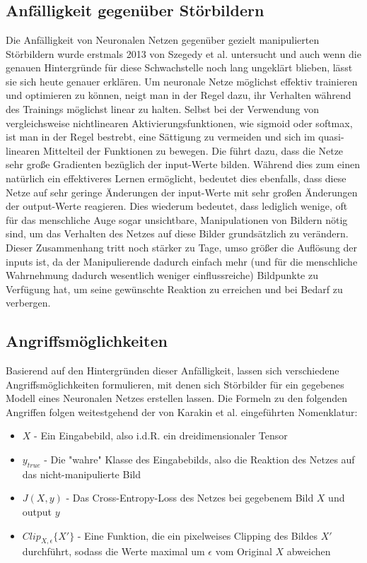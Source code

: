 \chapter{}
\label{cha:stateOfTheArt}
\section{Anfälligkeit gegenüber Störbildern}
Die Anfälligkeit von Neuronalen Netzen gegenüber gezielt manipulierten Störbildern wurde erstmals 2013 von Szegedy et al. untersucht und auch wenn die genauen Hintergründe für diese Schwachstelle noch lang ungeklärt blieben, lässt sie sich heute genauer erklären.
Um neuronale Netze möglichst effektiv trainieren und optimieren zu können, neigt man in der Regel dazu, ihr Verhalten während des Trainings möglichst linear zu halten. Selbst bei der Verwendung von vergleichsweise nichtlinearen Aktivierungsfunktionen, wie sigmoid oder softmax, ist man in der Regel bestrebt, eine Sättigung zu vermeiden und sich im quasi-linearen Mittelteil der Funktionen zu bewegen. Die führt dazu, dass die Netze sehr große Gradienten bezüglich der input-Werte bilden. Während dies zum einen natürlich ein effektiveres Lernen ermöglicht, bedeutet dies ebenfalls, dass diese Netze auf sehr geringe Änderungen der input-Werte mit sehr großen Änderungen der output-Werte reagieren. Dies wiederum bedeutet, dass lediglich wenige, oft für das menschliche Auge sogar unsichtbare, Manipulationen von Bildern nötig sind, um das Verhalten des Netzes auf diese Bilder grundsätzlich zu verändern.
Dieser Zusammenhang tritt noch stärker zu Tage, umso größer die Auflösung der inputs ist, da der Manipulierende dadurch einfach mehr (und für die menschliche Wahrnehmung dadurch wesentlich weniger einflussreiche) Bildpunkte zu Verfügung hat, um seine gewünschte Reaktion zu erreichen und bei Bedarf zu verbergen.

\section{Angriffsmöglichkeiten}
Basierend auf den Hintergründen dieser Anfälligkeit, lassen sich verschiedene Angriffsmöglichkeiten formulieren, mit denen sich Störbilder für ein gegebenes Modell eines Neuronalen Netzes erstellen lassen.
Die Formeln zu den folgenden Angriffen folgen weitestgehend der von Karakin et al. eingeführten Nomenklatur:
\begin{itemize}
	\item \(X\) - Ein Eingabebild, also i.d.R. ein dreidimensionaler Tensor
	\item \(y_{true} \) - Die "wahre" Klasse des Eingabebilds, also die Reaktion des Netzes auf das nicht-manipulierte Bild
	\item \(J(X,y)\) - Das Cross-Entropy-Loss des Netzes bei gegebenem Bild \(X\) und output \(y\) 
	\item \(Clip_{X,\epsilon}\{X'\} \) - Eine Funktion, die ein pixelweises Clipping des Bildes \(X'\) durchführt, sodass die Werte maximal um \(\epsilon\) vom Original \(X\) abweichen
\end{itemize}



